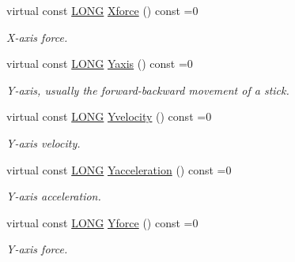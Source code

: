 \begin{DoxyCompactItemize}
virtual const \hyperlink{_joypad_8h_a2a3e0cda5f1249bef6db47c5eb8e3813}{L\+O\+NG} \hyperlink{struct_x_input_joypad_a44f5f31e6f0f63e3708dd4f73fe385df}{Xforce} () const =0
\begin{DoxyCompactList}\small\item\em X-\/axis force. \end{DoxyCompactList}\item 
\mbox{\label{struct_x_input_joypad_ac759aadee2870928828e8ab0454227f2}} 
virtual const \hyperlink{_joypad_8h_a2a3e0cda5f1249bef6db47c5eb8e3813}{L\+O\+NG} \hyperlink{struct_x_input_joypad_ac759aadee2870928828e8ab0454227f2}{Yaxis} () const =0
\begin{DoxyCompactList}\small\item\em Y-\/axis, usually the forward-\/backward movement of a stick. \end{DoxyCompactList}\item 
\mbox{\label{struct_x_input_joypad_ac9a7c48ad012b41ed2113531cb0e6604}} 
virtual const \hyperlink{_joypad_8h_a2a3e0cda5f1249bef6db47c5eb8e3813}{L\+O\+NG} \hyperlink{struct_x_input_joypad_ac9a7c48ad012b41ed2113531cb0e6604}{Yvelocity} () const =0
\begin{DoxyCompactList}\small\item\em Y-\/axis velocity. \end{DoxyCompactList}\item 
\mbox{\label{struct_x_input_joypad_a06c6ece1347b8bb7db762b0181fac206}} 
virtual const \hyperlink{_joypad_8h_a2a3e0cda5f1249bef6db47c5eb8e3813}{L\+O\+NG} \hyperlink{struct_x_input_joypad_a06c6ece1347b8bb7db762b0181fac206}{Yacceleration} () const =0
\begin{DoxyCompactList}\small\item\em Y-\/axis acceleration. \end{DoxyCompactList}\item 
\mbox{\label{struct_x_input_joypad_a3365d3f59d8a45b96da53837872c09c6}} 
virtual const \hyperlink{_joypad_8h_a2a3e0cda5f1249bef6db47c5eb8e3813}{L\+O\+NG} \hyperlink{struct_x_input_joypad_a3365d3f59d8a45b96da53837872c09c6}{Yforce} () const =0
\begin{DoxyCompactList}\small\item\em Y-\/axis force. \end{DoxyCompactList}\item 

\end{DoxyCompactItemize}
